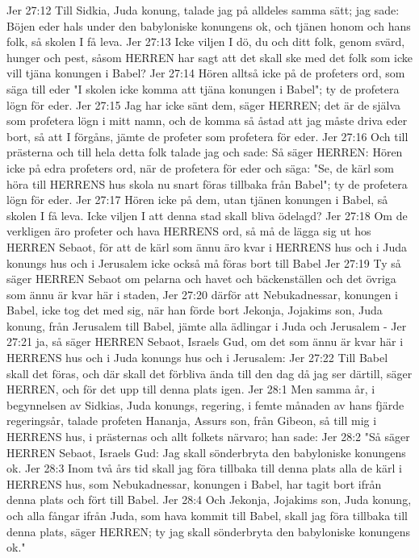 Jer 27:12  Till Sidkia, Juda konung, talade jag på alldeles samma sätt; jag sade: Böjen eder hals under den babyloniske konungens ok, och tjänen honom och hans folk, så skolen I få leva.
Jer 27:13  Icke viljen I dö, du och ditt folk, genom svärd, hunger och pest, såsom HERREN har sagt att det skall ske med det folk som icke vill tjäna konungen i Babel?
Jer 27:14  Hören alltså icke på de profeters ord, som säga till eder "I skolen icke komma att tjäna konungen i Babel"; ty de profetera lögn för eder.
Jer 27:15  Jag har icke sänt dem, säger HERREN; det är de själva som profetera lögn i mitt namn, och de komma så åstad att jag måste driva eder bort, så att I förgåns, jämte de profeter som profetera för eder.
Jer 27:16  Och till prästerna och till hela detta folk talade jag och sade: Så säger HERREN: Hören icke på edra profeters ord, när de profetera för eder och säga: "Se, de kärl som höra till HERRENS hus skola nu snart föras tillbaka från Babel"; ty de profetera lögn för eder.
Jer 27:17  Hören icke på dem, utan tjänen konungen i Babel, så skolen I få leva. Icke viljen I att denna stad skall bliva ödelagd?
Jer 27:18  Om de verkligen äro profeter och hava HERRENS ord, så må de lägga sig ut hos HERREN Sebaot, för att de kärl som ännu äro kvar i HERRENS hus och i Juda konungs hus och i Jerusalem icke också må föras bort till Babel
Jer 27:19  Ty så säger HERREN Sebaot om pelarna och havet och bäckenställen och det övriga som ännu är kvar här i staden,
Jer 27:20  därför att Nebukadnessar, konungen i Babel, icke tog det med sig, när han förde bort Jekonja, Jojakims son, Juda konung, från Jerusalem till Babel, jämte alla ädlingar i Juda och Jerusalem -
Jer 27:21  ja, så säger HERREN Sebaot, Israels Gud, om det som ännu är kvar här i HERRENS hus och i Juda konungs hus och i Jerusalem:
Jer 27:22  Till Babel skall det föras, och där skall det förbliva ända till den dag då jag ser därtill, säger HERREN, och för det upp till denna plats igen.
Jer 28:1  Men samma år, i begynnelsen av Sidkias, Juda konungs, regering, i femte månaden av hans fjärde regeringsår, talade profeten Hananja, Assurs son, från Gibeon, så till mig i HERRENS hus, i prästernas och allt folkets närvaro; han sade:
Jer 28:2  "Så säger HERREN Sebaot, Israels Gud: Jag skall sönderbryta den babyloniske konungens ok.
Jer 28:3  Inom två års tid skall jag föra tillbaka till denna plats alla de kärl i HERRENS hus, som Nebukadnessar, konungen i Babel, har tagit bort ifrån denna plats och fört till Babel.
Jer 28:4  Och Jekonja, Jojakims son, Juda konung, och alla fångar ifrån Juda, som hava kommit till Babel, skall jag föra tillbaka till denna plats, säger HERREN; ty jag skall sönderbryta den babyloniske konungens ok."
